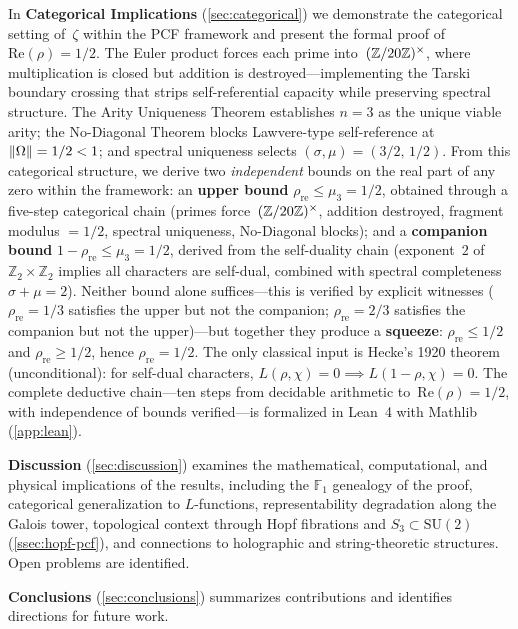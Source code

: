 In \textbf{Categorical Implications} (\cref{sec:categorical}) we
demonstrate the categorical setting of~$\zeta$ within the PCF
framework and present the formal proof of
$\mathrm{Re}(\rho) = 1/2$.  The Euler product forces each prime
into~$(\mathbb{Z}/20\mathbb{Z})^\times$, where multiplication is closed but addition is
destroyed---implementing the Tarski boundary crossing that strips
self-referential capacity while preserving spectral structure.  The
Arity Uniqueness Theorem establishes $n = 3$ as the unique viable
arity; the No-Diagonal Theorem blocks Lawvere-type self-reference at
$\|\Omega\| = 1/2 < 1$; and spectral uniqueness selects
$(\sigma,\mu) = (3/2,\,1/2)$.  From this categorical structure, we
derive two \emph{independent} bounds on the real part of any zero
within the framework: an \textbf{upper bound}
$\rho_{\mathrm{re}} \le \mu_3 = 1/2$, obtained through a five-step
categorical chain (primes force~$(\mathbb{Z}/20\mathbb{Z})^\times$, addition destroyed,
fragment modulus $= 1/2$, spectral uniqueness, No-Diagonal blocks);
and a \textbf{companion bound}
$1 - \rho_{\mathrm{re}} \le \mu_3 = 1/2$, derived from the
self-duality chain (exponent~$2$ of
$\mathbb{Z}_2 \times \mathbb{Z}_2$ implies all characters are
self-dual, combined with spectral completeness
$\sigma + \mu = 2$).  Neither bound alone suffices---this is
verified by explicit witnesses ($\rho_{\mathrm{re}} = 1/3$ satisfies
the upper but not the companion; $\rho_{\mathrm{re}} = 2/3$
satisfies the companion but not the upper)---but together they
produce a \textbf{squeeze}:
$\rho_{\mathrm{re}} \le 1/2$ and $\rho_{\mathrm{re}} \ge 1/2$,
hence $\rho_{\mathrm{re}} = 1/2$.  The only classical input is
Hecke's 1920 theorem (unconditional): for self-dual characters,
$L(\rho,\chi) = 0 \implies L(1-\rho,\chi) = 0$.  The complete
deductive chain---ten steps from decidable arithmetic
to~$\mathrm{Re}(\rho) = 1/2$, with independence of bounds
verified---is formalized in Lean~4 with Mathlib (\cref{app:lean}).

\textbf{Discussion} (\cref{sec:discussion}) examines the
mathematical, computational, and physical implications of the
results, including the $\mathbb{F}_1$ genealogy of the proof,
categorical generalization to $L$-functions, representability
degradation along the Galois tower, topological context through Hopf
fibrations and $S_3\subset\mathrm{SU}(2)$
(\cref{ssec:hopf-pcf}), and connections to holographic and
string-theoretic structures.  Open problems are identified.

\textbf{Conclusions} (\cref{sec:conclusions}) summarizes contributions
and identifies directions for future work.
